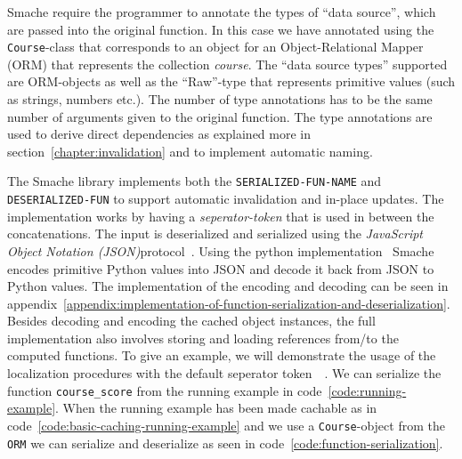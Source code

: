 \begin{figure*}[ht!]
  
  \caption{Implementation of basic caching on the running example}
  \label{code:basic-caching-running-example}
\end{figure*}

Smache require the programmer to annotate the types of ``data source'', which are passed into the original function. In this case we have annotated using the \verb$Course$-class that corresponds to an object for an Object-Relational Mapper (ORM) that represents the collection \emph{course}. The ``data source types'' supported are ORM-objects as well as the ``Raw''-type that represents primitive values (such as strings, numbers etc.). The number of type annotations has to be the same number of arguments given to the original function. The type annotations are used to derive direct dependencies as explained more in section~\ref{chapter:invalidation} and to implement automatic naming.

The Smache library implements both the \verb$SERIALIZED-FUN-NAME$ and \verb$DESERIALIZED-FUN$ to support automatic invalidation and in-place updates. The implementation works by having a \emph{seperator-token} that is used in between the concatenations. The input is deserialized and serialized using the \emph{JavaScript Object Notation (JSON)}protocol~\cite{docs:json}. Using the python implementation~\cite{docs:python-json} Smache encodes primitive Python values into JSON and decode it back from JSON to Python values. The implementation of the encoding and decoding can be seen in appendix~\ref{appendix:implementation-of-function-serialization-and-deserialization}. Besides decoding and encoding the cached object instances, the full implementation also involves storing and loading references from/to the computed functions.
To give an example, we will demonstrate the usage of the localization procedures with the default seperator token $~~~$. We can serialize the function \verb$course_score$ from the running example in code~\ref{code:running-example}. When the running example has been made cachable as in code~\ref{code:basic-caching-running-example} and we use a \verb$Course$-object from the \verb$ORM$ we can serialize and deserialize as seen in code~\ref{code:function-serialization}.

\begin{figure*}[ht!]
  
  \caption{Example of how function serialization and deserialization can be done in Smache}
  \label{code:function-serialization}
\end{figure*}

